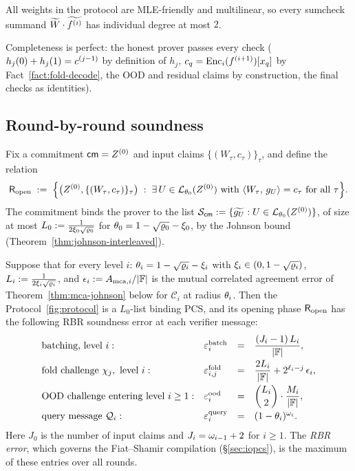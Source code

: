All weights in the protocol are MLE-friendly and multilinear, so every sumcheck summand $\widetilde{W} \cdot \widetilde{f^{(i)}}$ has individual degree at most $2$.

Completeness is perfect: the honest prover passes every check ($h_j(0) + h_j(1) = c^{(j-1)}$ by definition of $h_j$, $c_q = \mathrm{Enc}_i(f^{(i+1)})[x_q]$ by Fact~\ref{fact:fold-decode}, the OOD and residual claims by construction, the final checks as identities).

\subsection{Round-by-round soundness}\label{sec:soundness}

Fix a commitment $\mathsf{cm} = Z^{(0)}$ and input claims $\{(W_\tau, c_\tau)\}_\tau$, and define the relation
\[
\mathsf{R}_{\mathrm{open}} \;:=\; \Bigl\{ \bigl(Z^{(0)}, \{(W_\tau, c_\tau)\}_\tau\bigr) \;:\; \exists\, U \in \mathcal{L}_{\theta_0}(Z^{(0)}) \text{ with } \langle W_\tau,\, g_U \rangle = c_\tau \text{ for all } \tau \Bigr\}.
\]
The commitment binds the prover to the list $\mathcal{S}_{\mathsf{cm}} := \{\widetilde{g_U} : U \in \mathcal{L}_{\theta_0}(Z^{(0)})\}$, of size at most $L_0 := \tfrac{1}{2\xi_0\sqrt{\varrho_0}}$ for $\theta_0 = 1 - \sqrt{\varrho_0} - \xi_0$, by the Johnson bound (Theorem~\ref{thm:johnson-interleaved}).

\begin{theorem}\label{thm:rbr}
Suppose that for every level $i$: $\theta_i = 1 - \sqrt{\varrho_i} - \xi_i$ with $\xi_i \in (0, 1-\sqrt{\varrho_i})$, $L_i := \tfrac{1}{2\xi_i\sqrt{\varrho_i}}$, and $\epsilon_i := A_{\mathrm{mca},i}/|\mathbb{F}|$ is the mutual correlated agreement error of Theorem~\ref{thm:mca-johnson} below for $\mathcal{C}_i$ at radius $\theta_i$. Then the Protocol~\ref{fig:protocol} is a $L_0$-list binding PCS, and its opening phase $\mathsf{R}_{\mathrm{open}}$ has the following RBR soundness error at each verifier message:
\[
\begin{array}{llcl}
\textnormal{batching, level } i: & \varepsilon^{\mathrm{batch}}_i &=& \dfrac{(J_i - 1)\, L_i}{|\mathbb{F}|} , \\[2ex]
\textnormal{fold challenge } \chi_j, \textnormal{ level } i: & \varepsilon^{\mathrm{fold}}_{i,j} &=& \dfrac{2 L_i}{|\mathbb{F}|} + 2^{\ell_i - j}\, \epsilon_i , \\[2ex]
\textnormal{OOD challenge entering level } i \ge 1: & \varepsilon^{\mathrm{ood}}_i &=& \dbinom{L_i}{2} \cdot \dfrac{M_i}{|\mathbb{F}|} , \\[2ex]
\textnormal{query message } \mathcal{Q}_i: & \varepsilon^{\mathrm{query}}_i &=& (1 - \theta_i)^{\omega_i} .
\end{array}
\]
Here $J_0$ is the number of input claims and $J_i = \omega_{i-1} + 2$ for $i \ge 1$. The \emph{RBR error}, which governs the Fiat--Shamir compilation (\S\ref{sec:iopcs}), is the maximum of these entries over all rounds.
\end{theorem}

